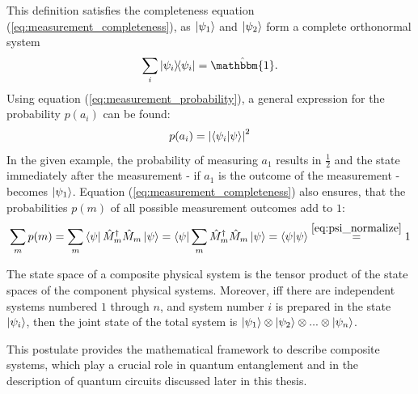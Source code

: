 	This definition satisfies the completeness equation (\ref{eq:measurement_completeness}), as $\ket{\psi_1}$ and $\ket{\psi_2}$ form a complete orthonormal system
	\begin{equation}
		\label{eq:cons_completeness}
		\sum_{i}\ketbra{\psi_i}{\psi_i}=\hat{\mathbbm{1}}.
	\end{equation}
	Using equation (\ref{eq:measurement_probability}), a general expression for the probability $p(a_i)$ can be found:
	\begin{equation}
		\label{eq:measurement_probability_a}
		p(a_i)=\abs{\braket{\psi_i}{\psi}}^2
	\end{equation}
	In the given example, the probability of measuring $a_1$ results in $\frac{1}{2}$ and the state immediately after the measurement - if $a_1$ is the outcome of the measurement - becomes $\ket{\psi_1}$. Equation (\ref{eq:measurement_completeness}) also ensures, that the probabilities $p(m)$ of all possible measurement outcomes add to $1$:
	\begin{equation}
		\label{eq:measurement_probability_sum}
		\sum_{m}p(m)=\sum_{m}\bra{\psi}\hat{M}_m^\dagger \hat{M}_m\ket{\psi}=\bra{\psi}\sum_{m}\hat{M}_m^\dagger\hat{M}_m\ket{\psi}=\braket{\psi}{\psi}\overset{\eqref{eq:psi_normalize}}{=}1
	\end{equation}
	\begin{postulatebox}
		\begin{postulate}
			\label{post:qm_4}
			The state space of a composite physical system is the tensor product of the state spaces of the component physical systems. Moreover, iff there are independent systems numbered $1$ through $n$, and system number $i$ is prepared in the state $\ket{\psi_i}$, then the joint state of the total system is $\ket{\psi_1}\otimes\ket{\psi_2}\otimes ... \otimes\ket{\psi_n}$.
		\end{postulate}
	\end{postulatebox}
	This postulate provides the mathematical framework to describe composite systems, which play a crucial role in quantum entanglement and in the description of quantum circuits discussed later in this thesis.

